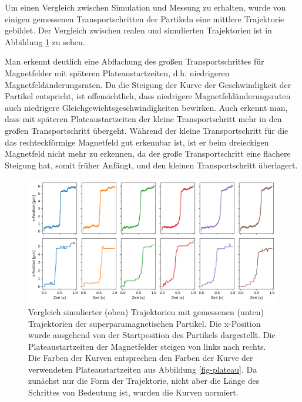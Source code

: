 \documentclass[page,pdftex,12pt,a4paper,twoside,openright]{scrbook}
\begin{document}
Um einen Vergleich zwischen Simulation und Messung zu erhalten, wurde von einigen gemessenen Transportschritten der Partikeln eine mittlere Trajektorie gebildet. Der Vergleich zwischen realen und simulierten Trajektorien ist in Abbildung \ref{fig-traj} zu sehen.

Man erkennt deutlich eine Abflachung des großen Transportschrittes für Magnetfelder mit späteren Plateaustartzeiten, d.h. niedrigeren Magnetfeldänderungsraten. Da die Steigung der Kurve der Geschwindigkeit der Partikel entspricht, ist offensichtlich, dass niedrigere Magnetfeldänderungsraten auch niedrigere Gleichgewichtsgeschwindigkeiten bewirken. Auch erkennt man, dass mit späteren Plateaustartzeiten der kleine Transportschritt mehr in den großen Transportschritt übergeht. Während der kleine Transportschritt für die das rechteckförmige Magnetfeld gut erkennbar ist, ist er beim dreieckigen Magnetfeld nicht mehr zu erkennen, da der große Transportschritt eine flachere Steigung hat, somit früher Anfängt, und den kleinen Transportschritt überlagert.

\begin{figure}[htbp]
\centering
\includegraphics[width=\textwidth]{./img/sim.png}
\caption{\label{fig-traj}
Vergleich simulierter (oben) Trajektorien mit gemessenen (unten) Trajektorien der superparamagnetischen Partikel. Die x-Position wurde ausgehend von der Startposition des Partikels dargestellt. Die Plateaustartzeiten der Magnetfelder steigen von links nach rechts. Die Farben der Kurven entsprechen den Farben der Kurve der verwendeten Plateaustartzeiten aus Abbildung \ref{fig-plateau}. Da zunächst nur die Form der Trajektorie, nicht aber die Länge des Schrittes von Bedeutung ist, wurden die Kurven normiert.}
\end{figure}
\end{document}
